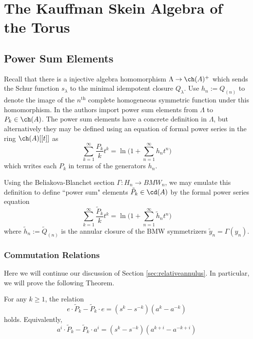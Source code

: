\chapter{The Kauffman Skein Algebra of the Torus}



\section{Power Sum Elements}

Recall that there is a injective algebra homomorphism $\Lambda \to \ch(A)^+$ which sends the Schur function $s_\lambda$ to the minimal idempotent closure $Q_\lambda$. Use $h_n := Q_{(n)}$ to denote the image of the $n^\textrm{th}$ complete homogeneous symmetric function under this homomorphism. In  the authors import power sum elements from $\Lambda$ to $P_k \in \ch(A)$. The power sum elements have a concrete definition in $\Lambda$, but alternatively they may be defined using an equation of formal power series in the ring $\ch(A)[[t]]$ as
\begin{equation}
\sum_{k=1}^\infty \frac{P_k}{k} t^k = \ln \Bigg( 1 + \sum_{n=1}^\infty h_n t^n \Bigg)
\end{equation}
which writes each $P_k$ in terms of the generators $h_n$. 

Using the Beliakova-Blanchet section $\Gamma: H_n \to BMW_n$, we may emulate this definition to define ``power sum" elements $\tilde{P}_k \in \cd(A)$ by the formal power series equation
\begin{equation}
\sum_{k=1}^\infty \frac{\tilde{P}_k}{k} t^k = \ln \Bigg( 1 + \sum_{n=1}^\infty \tilde{h}_n t^n \Bigg)
\end{equation}
where $\tilde{h}_n := \tilde{Q}_{(n)}$ is the annular closure of the BMW symmetrizers $\tilde{y}_n = \Gamma(y_n)$.


\subsection{Commutation Relations} \label{sec:commurationrelations}

Here we will continue our discussion of Section \ref{sec:relativeannulus}. In particular, we will prove the following Theorem.

\begin{theorem} \label{thm:powersumcommutator}
For any $k \geq 1$, the relation
\[
e \cdot \tilde{P}_k - \tilde{P}_k \cdot e = (s^k - s^{-k}) (a^k - a^{-k})
\]
holds. Equivalently,
\[
a^i \cdot \tilde{P}_k - \tilde{P}_k \cdot a^i = (s^k - s^{-k}) (a^{k+i} - a^{-k+i})
\]
\end{theorem}

